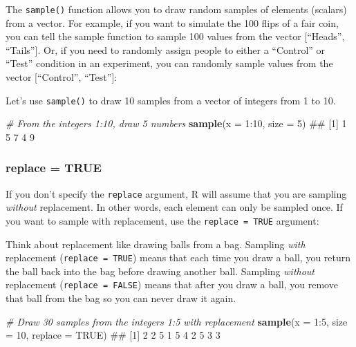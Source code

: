 \documentclass[]{book}
\newenvironment{Shaded}{\begin{snugshade}}{\end{snugshade}}
\newcommand{\KeywordTok}[1]{\textcolor[rgb]{0.13,0.29,0.53}{\textbf{{#1}}}}
\newcommand{\DataTypeTok}[1]{\textcolor[rgb]{0.13,0.29,0.53}{{#1}}}
\newcommand{\DecValTok}[1]{\textcolor[rgb]{0.00,0.00,0.81}{{#1}}}
\newcommand{\CommentTok}[1]{\textcolor[rgb]{0.56,0.35,0.01}{\textit{{#1}}}}
\newcommand{\OtherTok}[1]{\textcolor[rgb]{0.56,0.35,0.01}{{#1}}}
\newcommand{\NormalTok}[1]{{#1}}
\theoremstyle{definition}
\theoremstyle{definition}
\theoremstyle{remark}
\begin{document}
The \texttt{sample()} function allows you to draw random samples of
elements (scalars) from a vector. For example, if you want to simulate
the 100 flips of a fair coin, you can tell the sample function to sample
100 values from the vector {[}``Heads'', ``Tails''{]}. Or, if you need
to randomly assign people to either a ``Control'' or ``Test'' condition
in an experiment, you can randomly sample values from the vector
{[}``Control'', ``Test''{]}:

Let's use \texttt{sample()} to draw 10 samples from a vector of integers
from 1 to 10.

\begin{Shaded}
\begin{Highlighting}[]
\CommentTok{# From the integers 1:10, draw 5 numbers}
\KeywordTok{sample}\NormalTok{(}\DataTypeTok{x =} \DecValTok{1}\NormalTok{:}\DecValTok{10}\NormalTok{, }\DataTypeTok{size  =} \DecValTok{5}\NormalTok{)}
\NormalTok{## [1] 1 5 7 4 9}
\end{Highlighting}
\end{Shaded}

\subsubsection{replace = TRUE}\label{replace-true}

If you don't specify the \texttt{replace} argument, R will assume that
you are sampling \emph{without} replacement. In other words, each
element can only be sampled once. If you want to sample with
replacement, use the \texttt{replace\ =\ TRUE} argument:

Think about replacement like drawing balls from a bag. Sampling
\emph{with} replacement (\texttt{replace\ =\ TRUE}) means that each time
you draw a ball, you return the ball back into the bag before drawing
another ball. Sampling \emph{without} replacement
(\texttt{replace\ =\ FALSE}) means that after you draw a ball, you
remove that ball from the bag so you can never draw it again.

\begin{Shaded}
\begin{Highlighting}[]
\CommentTok{# Draw 30 samples from the integers 1:5 with replacement}
\KeywordTok{sample}\NormalTok{(}\DataTypeTok{x =} \DecValTok{1}\NormalTok{:}\DecValTok{5}\NormalTok{, }\DataTypeTok{size =} \DecValTok{10}\NormalTok{, }\DataTypeTok{replace =} \OtherTok{TRUE}\NormalTok{)}
\NormalTok{##  [1] 2 2 5 1 5 4 2 5 3 3}
\end{Highlighting}
\end{Shaded}
\end{document}
